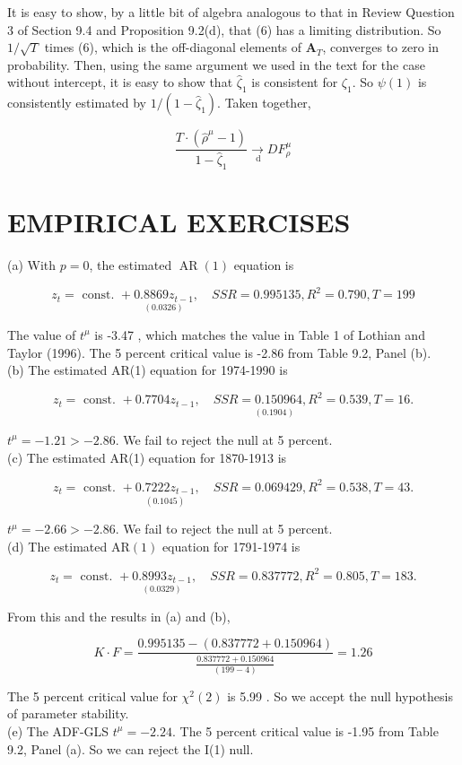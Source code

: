 \documentclass[10pt]{article}
\begin{document}
It is easy to show, by a little bit of algebra analogous to that in Review Question 3 of Section 9.4 and Proposition 9.2(d), that (6) has a limiting distribution. So $1 / \sqrt{T}$ times (6), which is the off-diagonal elements of $\mathbf{A}_{T}$, converges to zero in probability. Then, using the same argument we used in the text for the case without intercept, it is easy to show that $\hat{\zeta}_{1}$ is consistent for $\zeta_{1}$. So $\psi(1)$ is consistently estimated by $1 /\left(1-\hat{\zeta}_{1}\right)$. Taken together,

$$
\frac{T \cdot\left(\hat{\rho}^{\mu}-1\right)}{1-\hat{\zeta}_{1}} \underset{\mathrm{~d}}{\rightarrow} D F_{\rho}^{\mu}
$$

\section*{EMPIRICAL EXERCISES}
(a) With $p=0$, the estimated $\operatorname{AR}(1)$ equation is

$$
z_{t}=\text { const. }+\underset{(0.0326)}{0.8869 z_{t-1}}, \quad S S R=0.995135, R^{2}=0.790, T=199
$$

The value of $t^{\mu}$ is -3.47 , which matches the value in Table 1 of Lothian and Taylor (1996). The 5 percent critical value is -2.86 from Table 9.2, Panel (b).\\
(b) The estimated AR(1) equation for 1974-1990 is

$$
z_{t}=\text { const. }+\underset{(0.1904)}{0.7704 z_{t-1}, \quad S S R=0.150964, R^{2}=0.539, T=16 .}
$$

$t^{\mu}=-1.21>-2.86$. We fail to reject the null at 5 percent.\\
(c) The estimated AR(1) equation for 1870-1913 is

$$
z_{t}=\text { const. }+\underset{(0.1045)}{0.7222 z_{t-1}}, \quad S S R=0.069429, R^{2}=0.538, T=43 .
$$

$t^{\mu}=-2.66>-2.86$. We fail to reject the null at 5 percent.\\
(d) The estimated $\mathrm{AR}(1)$ equation for 1791-1974 is

$$
z_{t}=\text { const. }+\underset{(0.0329)}{0.8993 z_{t-1}}, \quad S S R=0.837772, R^{2}=0.805, T=183 .
$$

From this and the results in (a) and (b),

$$
K \cdot F=\frac{0.995135-(0.837772+0.150964)}{\frac{0.837772+0.150964}{(199-4)}}=1.26
$$

The 5 percent critical value for $\chi^{2}(2)$ is 5.99 . So we accept the null hypothesis of parameter stability.\\
(e) The ADF-GLS $t^{\mu}=-2.24$. The 5 percent critical value is -1.95 from Table 9.2, Panel (a). So we can reject the I(1) null.
\end{document}
